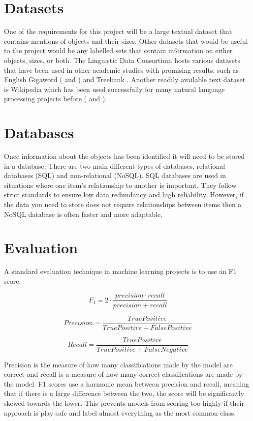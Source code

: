 \documentclass[11pt,oneside]{book}
\begin{document}
\section{Datasets}

One of the requirements for this project will be a large textual dataset that contains mentions of objects and their sizes. Other datasets that would be useful to the project would be any labelled sets that contain information on either objects, sizes, or both. The Linguistic Data Consortium hosts various datasets that have been used in other academic studies with promising results, such as English Gigaword (\cite{gigaword_one} and \cite{gigaword_two}) and Treebank \citep{treebank}. Another readily available text dataset is Wikipedia which has been used successfully for many natural language processing projects before (\cite{wiki_nlp} and \cite{wiki_nlp_two}).

\section{Databases}

Once information about the objects has been identified it will need to be stored in a database. There are two main different types of databases, relational databases (SQL) and non-relational (NoSQL). SQL databases are used in situations where one item's relationship to another is important. They follow strict standards to ensure low data redundancy and high reliability. However, if the data you need to store does not require relationships between items then a NoSQL database is often faster and more adaptable. 

\section{Evaluation}
A standard evaluation technique in machine learning projects is to use an F1 score.

\[ F_1 = 2 \cdot \frac{precision \cdot recall}{precision + recall} \]

\[ Precision = \frac{True Positive}{True Positive + False Positive} \]

\[ Recall = \frac{True Positive}{True Positive + False Negative} \]

Precision is the measure of how many classifications made by the model are correct and recall is a measure of how many correct classifications are made by the model. F1 scores use a harmonic mean between precision and recall, meaning that if there is a large difference between the two, the score will be significantly skewed towards the lower. This prevents models from scoring too highly if their approach is play safe and label almost everything as the most common class.
\end{document}
